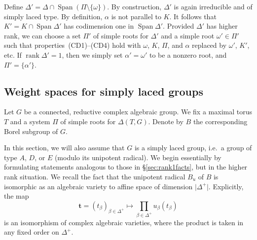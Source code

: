 \documentclass{amsart}
\theoremstyle{plain}
\theoremstyle{definition}
\theoremstyle{remark}
\newcommand{\Vect}[1]{\mathbold{#1}}
\providecommand{\abs}[1]{\lvert#1\rvert}
\begin{document}
Define $\Delta' = \Delta \cap
\operatorname{Span}(\Pi \setminus \{\omega\})$. By
construction, $\Delta'$ is again irreducible and of simply laced type.
By definition, $\alpha$ is not parallel to $K$. It follows that $K' = K \cap
\operatorname{Span} \Delta'$ has codimension one in $\operatorname{Span} \Delta'$.
Provided $\Delta'$ has higher rank, we can choose a set $\Pi'$ of simple roots for $\Delta'$
and a simple root $\omega' \in \Pi'$ such
that properties~(CD1)--(CD4) hold with $\omega$, $K$,
$\Pi$, and $\alpha$ replaced by $\omega'$, $K'$, etc. If $\operatorname{rank} \Delta' =
1$, then we simply set $\alpha' = \omega'$ to be a nonzero root, and $\Pi' =
\{\alpha'\}$.

\subsection{Weight spaces for simply laced groups}\label{sec:weightspacesforSLgroups}
Let $G$ be a connected, reductive complex algebraic group.
We fix a maximal torus $T$
and a system $\Pi$ of simple roots for $\Delta(T, G)$. Denote by $B$ the corresponding
Borel subgroup of $G$.

In this section, we will also assume that $G$ is a simply laced group, i.e.\ a
group of type $A$, $D$, or $E$ (modulo its unipotent radical). 
We begin essentially by formulating statements analogous to those in \S\ref{sec:rank1facts}, but in the higher rank
situation. We recall the
fact that the unipotent radical $B_{u}$ of $B$ is isomorphic as an algebraic variety
to affine space of dimension $\abs{\Delta^{+}}$. Explicitly, the map
$$\Vect{t} = (t_{\beta})_{\beta \in \Delta^{+}} \mapsto \prod_{\beta \in \Delta^{+}}
u_{\beta}(t_{\beta})$$
is an isomorphism of complex algebraic varieties, where the product is taken in any fixed
order on $\Delta^{+}$.
\end{document}
